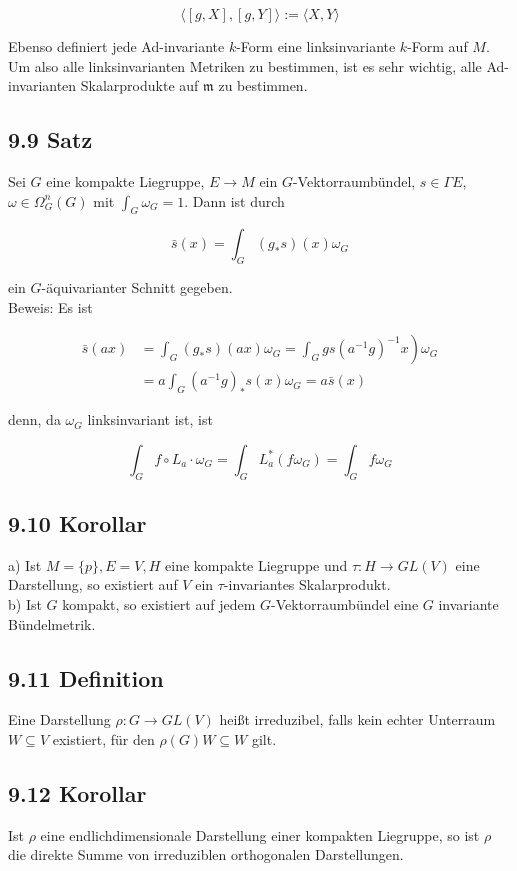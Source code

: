 \documentclass[10pt, letterpaper]{article}
\begin{document}
$$
\langle[g, X],[g, Y]\rangle:=\langle X, Y\rangle
$$

Ebenso definiert jede Ad-invariante $k$-Form eine linksinvariante $k$-Form auf $M$.\\
Um also alle linksinvarianten Metriken zu bestimmen, ist es sehr wichtig, alle Ad-invarianten Skalarprodukte auf $\mathfrak{m}$ zu bestimmen.

\subsection*{9.9 Satz}
Sei $G$ eine kompakte Liegruppe, $E \rightarrow M$ ein $G$-Vektorraumbündel, $s \in \Gamma E$, $\omega \in \Omega_{G}^{n}(G)$ mit $\int_{G} \omega_{G}=1$. Dann ist durch

$$
\bar{s}(x)=\int_{G}\left(g_{*} s\right)(x) \omega_{G}
$$

ein $G$-äquivarianter Schnitt gegeben.\\
Beweis: Es ist

$$
\begin{aligned}
\bar{s}(a x) & \left.=\int_{G}\left(g_{*} s\right)(a x) \omega_{G}=\int_{G} g s\left(a^{-1} g\right)^{-1} x\right) \omega_{G} \\
& =a \int_{G}\left(a^{-1} g\right)_{*} s(x) \omega_{G}=a \bar{s}(x)
\end{aligned}
$$

denn, da $\omega_{G}$ linksinvariant ist, ist

$$
\int_{G} f \circ L_{a} \cdot \omega_{G}=\int_{G} L_{a}^{*}\left(f \omega_{G}\right)=\int_{G} f \omega_{G}
$$

\subsection*{9.10 Korollar}
a) Ist $M=\{p\}, E=V, H$ eine kompakte Liegruppe und $\tau: H \rightarrow G L(V)$ eine Darstellung, so existiert auf $V$ ein $\tau$-invariantes Skalarprodukt.\\
b) Ist $G$ kompakt, so existiert auf jedem $G$-Vektorraumbündel eine $G$ invariante Bündelmetrik.

\subsection*{9.11 Definition}
Eine Darstellung $\rho: G \rightarrow G L(V)$ heißt irreduzibel, falls kein echter Unterraum $W \subseteq V$ existiert, für den $\rho(G) W \subseteq W$ gilt.

\subsection*{9.12 Korollar}
Ist $\rho$ eine endlichdimensionale Darstellung einer kompakten Liegruppe, so ist $\rho$ die direkte Summe von irreduziblen orthogonalen Darstellungen.
\end{document}
